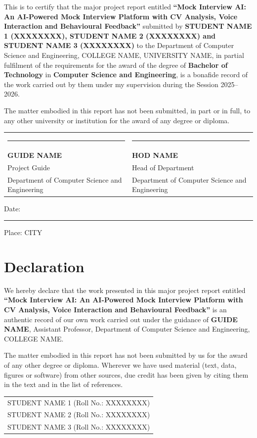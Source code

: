 \documentclass[12pt,a4paper,oneside]{report}
\newcommand{\projecttitle}{Mock Interview AI: An AI-Powered Mock Interview Platform with CV Analysis, Voice Interaction and Behavioural Feedback}
\newcommand{\studentnames}{STUDENT NAME 1 \quad (Roll No.: XXXXXXXX)\\ STUDENT NAME 2 \quad (Roll No.: XXXXXXXX)\\ STUDENT NAME 3 \quad (Roll No.: XXXXXXXX)}
\newcommand{\studentnamesinline}{STUDENT NAME 1 (XXXXXXXX), STUDENT NAME 2 (XXXXXXXX) and STUDENT NAME 3 (XXXXXXXX)}
\newcommand{\degreename}{Bachelor of Technology}
\newcommand{\branch}{Computer Science and Engineering}
\newcommand{\department}{Department of Computer Science and Engineering}
\newcommand{\college}{COLLEGE NAME}
\newcommand{\university}{UNIVERSITY NAME}
\newcommand{\city}{CITY}
\newcommand{\guide}{GUIDE NAME}
\newcommand{\guidedesignation}{Assistant Professor, \department}
\newcommand{\hod}{HOD NAME}
\newcommand{\session}{Session 2025--2026}
\begin{document}
This is to certify that the major project report entitled \textbf{``\projecttitle''} submitted by \textbf{\studentnamesinline} to the \department, \college, \university, in partial fulfilment of the requirements for the award of the degree of \textbf{\degreename} in \textbf{\branch}, is a bonafide record of the work carried out by them under my supervision during the \session.

The matter embodied in this report has not been submitted, in part or in full, to any other university or institution for the award of any degree or diploma.

\vspace{3cm}
\noindent
\begin{tabularx}{\textwidth}{@{}X X@{}}
\rule{5cm}{0.4pt} & \hfill\rule{5cm}{0.4pt} \\
\textbf{\guide} & \hfill\textbf{\hod} \\
Project Guide & \hfill Head of Department \\
\department & \hfill \department \\
\end{tabularx}

\vspace{2cm}
\noindent Date: \rule{3.5cm}{0.4pt} \hfill Place: \city

\chapter*{Declaration}
\thispagestyle{plain}

We hereby declare that the work presented in this major project report entitled \textbf{``\projecttitle''} is an authentic record of our own work carried out under the guidance of \textbf{\guide}, \guidedesignation, \college.

The matter embodied in this report has not been submitted by us for the award of any other degree or diploma. Wherever we have used material (text, data, figures or software) from other sources, due credit has been given by citing them in the text and in the list of references.

\vspace{3cm}
\noindent\begin{tabular}{@{}l@{}}
\studentnames
\end{tabular}
\end{document}

